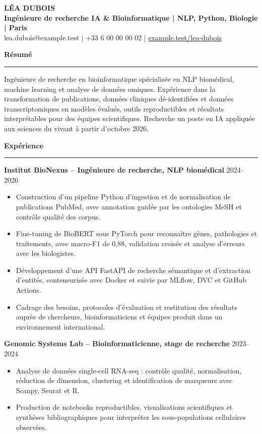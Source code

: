 \documentclass[10pt,a4paper]{article}
\newcommand{\cvsection}[1]{\par\vspace{3pt}\textbf{\large #1}\par\vspace{0.5pt}\rule{\linewidth}{0.35pt}\vspace{1pt}}
\begin{document}
\begin{center}
{\Large\textbf{LÉA DUBOIS}}\\[2pt]
\textbf{Ingénieure de recherche IA \& Bioinformatique | NLP, Python, Biologie | Paris}\\[2pt]
lea.dubois@example.test \;|\; +33 6 00 00 00 02 \;|\; \href{https://example.test/lea-dubois}{example.test/lea-dubois}
\end{center}

\cvsection{Résumé}
Ingénieure de recherche en bioinformatique spécialisée en NLP biomédical, machine learning et analyse de données omiques. Expérience dans la transformation de publications, données cliniques dé-identifiées et données transcriptomiques en modèles évalués, outils reproductibles et résultats interprétables pour des équipes scientifiques. Recherche un poste en IA appliquée aux sciences du vivant à partir d'octobre 2026.

\cvsection{Expérience}
\textbf{Institut BioNexus -- Ingénieure de recherche, NLP biomédical} \hfill 2024--2026
\begin{itemize}
\item Construction d'un pipeline Python d'ingestion et de normalisation de publications PubMed, avec annotation guidée par les ontologies MeSH et contrôle qualité des corpus.
\item Fine-tuning de BioBERT sous PyTorch pour reconnaître gènes, pathologies et traitements, avec macro-F1 de 0,88, validation croisée et analyse d'erreurs avec les biologistes.
\item Développement d'une API FastAPI de recherche sémantique et d'extraction d'entités, conteneurisée avec Docker et suivie par MLflow, DVC et GitHub Actions.
\item Cadrage des besoins, protocoles d'évaluation et restitution des résultats auprès de chercheurs, bioinformaticiens et équipes produit dans un environnement international.
\end{itemize}
\textbf{Genomic Systems Lab -- Bioinformaticienne, stage de recherche} \hfill 2023--2024
\begin{itemize}
\item Analyse de données single-cell RNA-seq : contrôle qualité, normalisation, réduction de dimension, clustering et identification de marqueurs avec Scanpy, Seurat et R.
\item Production de notebooks reproductibles, visualisations scientifiques et synthèses bibliographiques pour interpréter les sous-populations cellulaires observées.
\end{itemize}
\end{document}
